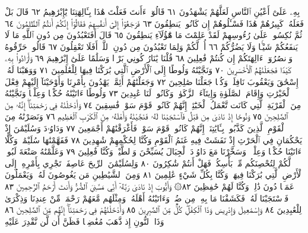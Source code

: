 بِهِۦ عَلَىٰٓ أَعْيُنِ ٱلنَّاسِ لَعَلَّهُمْ يَشْهَدُونَ ٦١ قَالُوٓا۟ ءَأَنتَ
فَعَلْتَ هَٰذَا بِـَٔالِهَتِنَا يَٰٓإِبْرَٰهِيمُ ٦٢ قَالَ بَلْ فَعَلَهُۥ كَبِيرُهُمْ
هَٰذَا فَسْـَٔلُوهُمْ إِن كَانُوا۟ يَنطِقُونَ ٦٣ فَرَجَعُوٓا۟ إِلَىٰٓ
أَنفُسِهِمْ فَقَالُوٓا۟ إِنَّكُمْ أَنتُمُ ٱلظَّٰلِمُونَ ٦٤ ثُمَّ نُكِسُوا۟
عَلَىٰ رُءُوسِهِمْ لَقَدْ عَلِمْتَ مَا هَٰٓؤُلَآءِ يَنطِقُونَ ٦٥ قَالَ
أَفَتَعْبُدُونَ مِن دُونِ ٱللَّهِ مَا لَا يَنفَعُكُمْ شَيْـࣰٔا وَلَا
يَضُرُّكُمْ ٦٦ أُفࣲّ لَّكُمْ وَلِمَا تَعْبُدُونَ مِن دُونِ ٱللَّهِۚ
أَفَلَا تَعْقِلُونَ ٦٧ قَالُوا۟ حَرِّقُوهُ وَٱنصُرُوٓا۟ ءَالِهَتَكُمْ إِن كُنتُمْ
فَٰعِلِينَ ٦٨ قُلْنَا يَٰنَارُ كُونِي بَرْدࣰا وَسَلَٰمًا عَلَىٰٓ إِبْرَٰهِيمَ ٦٩
وَأَرَادُوا۟ بِهِۦ كَيْدࣰا فَجَعَلْنَٰهُمُ ٱلْأَخْسَرِينَ ٧٠ وَنَجَّيْنَٰهُ
وَلُوطًا إِلَى ٱلْأَرْضِ ٱلَّتِي بَٰرَكْنَا فِيهَا لِلْعَٰلَمِينَ ٧١ وَوَهَبْنَا
لَهُۥٓ إِسْحَٰقَ وَيَعْقُوبَ نَافِلَةࣰۖ وَكُلࣰّا جَعَلْنَا صَٰلِحِينَ ٧٢
وَجَعَلْنَٰهُمْ أَئِمَّةࣰ يَهْدُونَ بِأَمْرِنَا وَأَوْحَيْنَآ إِلَيْهِمْ فِعْلَ
ٱلْخَيْرَٰتِ وَإِقَامَ ٱلصَّلَوٰةِ وَإِيتَآءَ ٱلزَّكَوٰةِۖ وَكَانُوا۟ لَنَا
عَٰبِدِينَ ٧٣ وَلُوطًا ءَاتَيْنَٰهُ حُكْمࣰا وَعِلْمࣰا وَنَجَّيْنَٰهُ مِنَ
ٱلْقَرْيَةِ ٱلَّتِي كَانَت تَّعْمَلُ ٱلْخَبَٰٓئِثَۚ إِنَّهُمْ كَانُوا۟ قَوْمَ سَوْءࣲ
فَٰسِقِينَ ٧٤ وَأَدْخَلْنَٰهُ فِي رَحْمَتِنَآۖ إِنَّهُۥ مِنَ ٱلصَّٰلِحِينَ ٧٥
وَنُوحًا إِذْ نَادَىٰ مِن قَبْلُ فَٱسْتَجَبْنَا لَهُۥ فَنَجَّيْنَٰهُ
وَأَهْلَهُۥ مِنَ ٱلْكَرْبِ ٱلْعَظِيمِ ٧٦ وَنَصَرْنَٰهُ مِنَ ٱلْقَوْمِ
ٱلَّذِينَ كَذَّبُوا۟ بِـَٔايَٰتِنَآۚ إِنَّهُمْ كَانُوا۟ قَوْمَ سَوْءࣲ فَأَغْرَقْنَٰهُمْ
أَجْمَعِينَ ٧٧ وَدَاوُۥدَ وَسُلَيْمَٰنَ إِذْ يَحْكُمَانِ فِي ٱلْحَرْثِ
إِذْ نَفَشَتْ فِيهِ غَنَمُ ٱلْقَوْمِ وَكُنَّا لِحُكْمِهِمْ شَٰهِدِينَ ٧٨
فَفَهَّمْنَٰهَا سُلَيْمَٰنَۚ وَكُلًّا ءَاتَيْنَا حُكْمࣰا وَعِلْمࣰاۚ وَسَخَّرْنَا
مَعَ دَاوُۥدَ ٱلْجِبَالَ يُسَبِّحْنَ وَٱلطَّيْرَۚ وَكُنَّا فَٰعِلِينَ ٧٩
وَعَلَّمْنَٰهُ صَنْعَةَ لَبُوسࣲ لَّكُمْ لِتُحْصِنَكُم مِّنۢ بَأْسِكُمْۖ
فَهَلْ أَنتُمْ شَٰكِرُونَ ٨٠ وَلِسُلَيْمَٰنَ ٱلرِّيحَ عَاصِفَةࣰ تَجْرِي بِأَمْرِهِۦٓ
إِلَى ٱلْأَرْضِ ٱلَّتِي بَٰرَكْنَا فِيهَاۚ وَكُنَّا بِكُلِّ شَيْءٍ عَٰلِمِينَ ٨١
وَمِنَ ٱلشَّيَٰطِينِ مَن يَغُوصُونَ لَهُۥ وَيَعْمَلُونَ عَمَلࣰا دُونَ
ذَٰلِكَۖ وَكُنَّا لَهُمْ حَٰفِظِينَ ٨٢۞ وَأَيُّوبَ إِذْ نَادَىٰ
رَبَّهُۥٓ أَنِّي مَسَّنِيَ ٱلضُّرُّ وَأَنتَ أَرْحَمُ ٱلرَّٰحِمِينَ ٨٣
فَٱسْتَجَبْنَا لَهُۥ فَكَشَفْنَا مَا بِهِۦ مِن ضُرࣲّۖ وَءَاتَيْنَٰهُ أَهْلَهُۥ
وَمِثْلَهُم مَّعَهُمْ رَحْمَةࣰ مِّنْ عِندِنَا وَذِكْرَىٰ لِلْعَٰبِدِينَ ٨٤
وَإِسْمَٰعِيلَ وَإِدْرِيسَ وَذَا ٱلْكِفْلِۖ كُلࣱّ مِّنَ ٱلصَّٰبِرِينَ ٨٥
وَأَدْخَلْنَٰهُمْ فِي رَحْمَتِنَآۖ إِنَّهُم مِّنَ ٱلصَّٰلِحِينَ ٨٦
وَذَا ٱلنُّونِ إِذ ذَّهَبَ مُغَٰضِبࣰا فَظَنَّ أَن لَّن نَّقْدِرَ عَلَيْهِ
